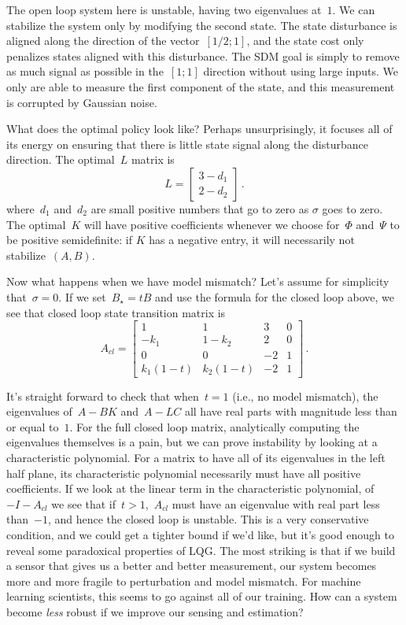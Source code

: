 \documentclass{tufte-book}
\begin{document}
The open loop system here is unstable, having two eigenvalues at~\(1\).
We can stabilize the system only by modifying the second state. The
state disturbance is aligned along the direction of the
vector~\([1/2;1]\), and the state cost only penalizes states aligned
with this disturbance. The SDM goal is simply to remove as much signal
as possible in the~\([1;1]\) direction without using large inputs. We
only are able to measure the first component of the state, and this
measurement is corrupted by Gaussian noise.

What does the optimal policy look like? Perhaps unsurprisingly, it
focuses all of its energy on ensuring that there is little state signal
along the disturbance direction. The optimal~\(L\) matrix is \[
    L=\begin{bmatrix} 3-d_1 \\ 2-d_2 \end{bmatrix}\,.
\] where~\(d_1\) and~\(d_2\) are small positive numbers that go to zero
as \(\sigma\) goes to zero. The optimal~\(K\) will have positive
coefficients whenever we choose for~\(\Phi\) and~\(\Psi\) to be positive
semidefinite: if \(K\) has a negative entry, it will necessarily not
stabilize~\((A,B)\).

Now what happens when we have model mismatch? Let's assume for
simplicity that~\(\sigma=0\). If we set~\(B_\star=tB\) and use the
formula for the closed loop above, we see that closed loop state
transition matrix is \[
A_{cl}=\begin{bmatrix}
1 & 1 & 3 & 0\\
    -k_1 & 1-k_2  & 2 & 0\\
    0 & 0 &-2 &1\\
    k_1(1-t) & k_2(1-t) & -2 & 1
    \end{bmatrix}\,.
\]

It's straight forward to check that when~\(t=1\) (i.e., no model
mismatch), the eigenvalues of~\(A-BK\) and~\(A-LC\) all have real parts
with magnitude less than or equal to~\(1\). For the full closed loop
matrix, analytically computing the eigenvalues themselves is a pain, but
we can prove instability by looking at a characteristic polynomial. For
a matrix to have all of its eigenvalues in the left half plane, its
characteristic polynomial necessarily must have all positive
coefficients. If we look at the linear term in the characteristic
polynomial, of~\(-I-A_{cl}\) we see that if~\(t>1\),~\(A_{cl}\) must
have an eigenvalue with real part less than~\(-1\), and hence the closed
loop is unstable. This is a very conservative condition, and we could
get a tighter bound if we'd like, but it's good enough to reveal some
paradoxical properties of LQG. The most striking is that if we build a
sensor that gives us a better and better measurement, our system becomes
more and more fragile to perturbation and model mismatch. For machine
learning scientists, this seems to go against all of our training. How
can a system become \emph{less} robust if we improve our sensing and
estimation?
\end{document}
